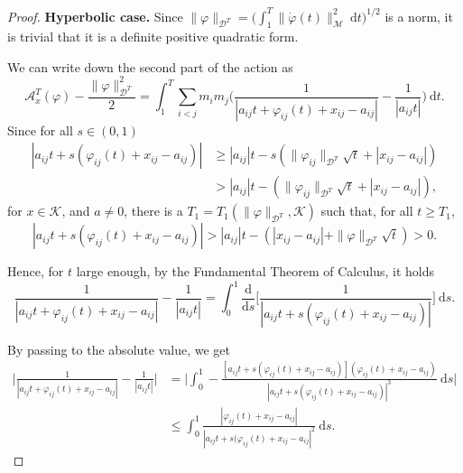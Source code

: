 \documentclass[a4paper,10pt]{amsart}
\newcommand{\ud}{\mathrm{d}}
\theoremstyle{plain}
\theoremstyle{definition}
\numberwithin{equation}{section}
\numberwithin{thm}{section}
\begin{document}
\begin{proof}
\textbf{Hyperbolic case.} Since $\|\varphi\|_{\mathcal{D}^T}=\big(\int_{1}^{T} \|\dot{\varphi}(t)\|_\mathcal{M}^2\ \ud t\big)^{1/2}$ is a norm, it is trivial that it is a definite positive quadratic form.

We can write down the second part of the action as
\begin{equation}
\label{eq:PQ_hyperbolic}
    \mathcal{A}_{x}^T(\varphi) - \frac{\|\varphi\|_{\mathcal{D}^T}^2}{2} = \int_{1}^{T} \sum_{i<j} m_i m_j \bigg(\frac{1}{|a_{ij} t +\varphi_{ij}(t) + x_{ij} - a_{ij}|} - \frac{1}{|a_{ij}t|} \bigg)\ \ud t.
\end{equation}
Since for all $s\in(0,1)$ 
\[
\begin{split}
     |a_{ij}t + s(\varphi_{ij}(t)+x_{ij} - a_{ij})| & \geq |a_{ij}|t - s(\|\varphi_{ij}\|_{\mathcal{D}^T}\sqrt{t}+|x_{ij} - a_{ij}|) \\
     & > |a_{ij}|t - (\|\varphi_{ij}\|_{\mathcal{D}^T}\sqrt{t}+|x_{ij} - a_{ij}|),
\end{split}
\]
for $x \in \mathcal K$, and $a\neq 0$, there is a $T_1=T_1(\|\varphi\|_{\mathcal{D}^T}, \mathcal K)$ such that, for all $t \ge T_1$,
\begin{equation}
    \label{eq:away_delta}
    |a_{ij}t + s(\varphi_{ij}(t) + x_{ij} - a_{ij})| > |a_{ij}|t - (|x_{ij} - a_{ij}| + \|\varphi\|_{\mathcal{D}^T}\sqrt{t})>0.
\end{equation}

Hence, for $t$ large enough, by the Fundamental Theorem of Calculus, it holds
\[
    \frac{1}{|a_{ij} t +\varphi_{ij}(t) + x_{ij} - a_{ij}|} - \frac{1}{|a_{ij}t|} = \int_{0}^{1} \frac{\ud}{\ud s}\bigg[\frac{1}{|a_{ij}t + s(\varphi_{ij}(t)+x_{ij} - a_{ij})|}\bigg]\ \ud s.
\]


By passing to the absolute value, we get
\[
\begin{split}
   \Bigg| \frac{1}{| a_{ij}t +\varphi_{ij}(t) + x_{ij} - a_{ij}|} - \frac{1}{|a_{ij}t|}\Bigg|
    &= \Bigg| \int_{0}^{1} -\frac{[a_{ij}t + s(\varphi_{ij}(t) + x_{ij} - a_{ij})](\varphi_{ij}(t) + x_{ij}-a_{ij})}{|a_{ij}t + s(\varphi_{ij}(t) + x_{ij} - a_{ij} )|^3}\ \ud s\Bigg|
    \\
    & \le \int_{0}^{1} \frac{|\varphi_{ij}(t)+x_{ij}-a_{ij}|}{|a_{ij}t + s(\varphi_{ij}(t)+x_{ij} -a_{ij} |^2}\ \ud s.
\end{split}
\]


\end{proof}
\end{document}
